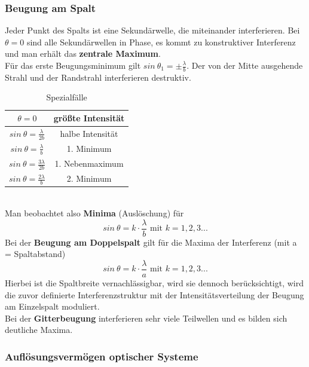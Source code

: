 \documentclass[12pt,a4paper,ngerman]{article}
\begin{document}
\pagebreak

\subsubsection{Beugung am Spalt}

Jeder Punkt des Spalts ist eine Sekundärwelle, die miteinander interferieren. Bei $\theta = 0$ sind alle Sekundärwellen in Phase, es kommt zu konstruktiver Interferenz und man erhält das \textbf{zentrale Maximum}. \\
Für das erste Beugungsminimum gilt $sin \ \theta_1 = \pm \frac{\lambda}{b}$. Der von der Mitte ausgehende Strahl und der Randstrahl interferieren destruktiv. 
\begin{table}[h!]
   \begin{center}
     \begin{tabular}{| c | c |}
     \hline
     $\theta = 0$ & größte Intensität  \\ \hline 
     $sin \ \theta = \frac{\lambda}{2b}$ & halbe Intensität \\ \hline
     $sin \ \theta = \frac{\lambda}{b}$ & 1. Minimum \\ \hline
     $sin \ \theta = \frac{3 \lambda}{2b}$ & 1. Nebenmaximum \\ \hline
     $sin \ \theta = \frac{2 \lambda}{b}$ & 2. Minimum \\ \hline     
     \end{tabular}
   \end{center}
   \caption{Spezialfälle}
 \end{table} 
 \\
Man beobachtet also \textbf{Minima} (Auslöschung) für 
\begin{equation}
sin \ \theta = k \cdot \frac{\lambda}{b} \text{ mit } k = 1,2,3...
\end{equation}
Bei der \textbf{Beugung am Doppelspalt} gilt für die Maxima der Interferenz (mit a = Spaltabstand)
\begin{equation}
sin \ \theta = k \cdot \frac{\lambda}{a} \text{ mit } k = 1,2,3...
\end{equation}
Hierbei ist die Spaltbreite vernachlässigbar, wird sie dennoch berücksichtigt, wird die zuvor definierte Interferenzstruktur mit der Intensitätsverteilung der Beugung am Einzelspalt moduliert. \\
Bei der \textbf{Gitterbeugung} interferieren sehr viele Teilwellen und es bilden sich deutliche Maxima.

\subsubsection{Auflösungsvermögen optischer Systeme}
\end{document}
